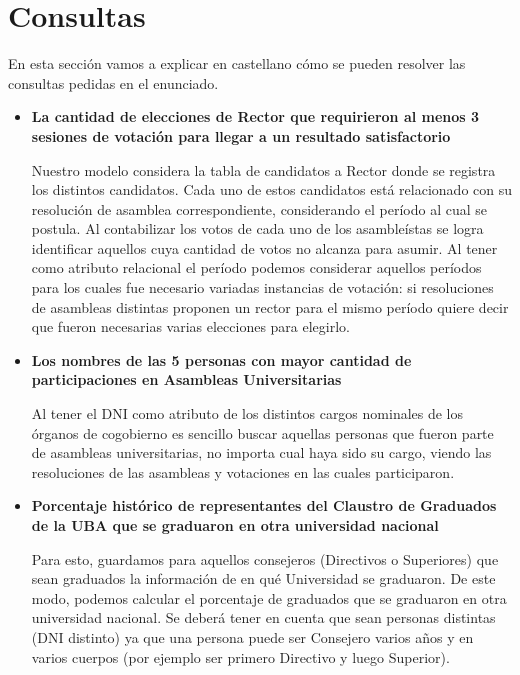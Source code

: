 \section{Consultas}

En esta sección vamos a explicar en castellano cómo se pueden resolver las consultas pedidas en el enunciado.

\begin{itemize}
\item \textbf{La cantidad de elecciones de Rector que requirieron al menos 3 sesiones de votación para llegar a un resultado satisfactorio}

Nuestro modelo considera la tabla de candidatos a Rector donde se registra los distintos candidatos. Cada uno de estos candidatos está relacionado con su resolución de asamblea correspondiente, considerando el período al cual se postula. Al contabilizar los votos de cada uno de los asambleístas se logra identificar aquellos cuya cantidad de votos no alcanza para asumir.
Al tener como atributo relacional el período podemos considerar aquellos períodos para los cuales fue necesario variadas instancias de votación: si resoluciones de asambleas distintas proponen un rector para el mismo período quiere decir que fueron necesarias varias elecciones para elegirlo.

\item \textbf{Los nombres de las 5 personas con mayor cantidad de participaciones en Asambleas Universitarias}

Al tener el DNI como atributo de los distintos cargos nominales de los órganos de cogobierno es sencillo buscar aquellas personas que fueron parte de asambleas universitarias, no importa cual haya sido su cargo, viendo las resoluciones de las asambleas y votaciones en las cuales participaron.

\item \textbf{Porcentaje  histórico  de  representantes  del  Claustro  de  Graduados  de  la UBA que se graduaron en otra universidad nacional}

Para esto, guardamos para aquellos consejeros (Directivos o Superiores) que sean graduados la información de en qué Universidad se graduaron. De este modo, podemos calcular el porcentaje de graduados que se graduaron en otra universidad nacional. Se deberá tener en cuenta que sean personas distintas (DNI distinto) ya que una persona puede ser Consejero varios años y en varios cuerpos (por ejemplo ser primero Directivo y luego Superior).


\end{itemize}

